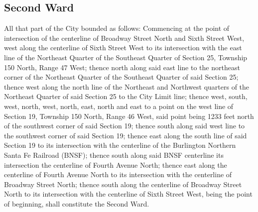 \subsection{Second Ward}
All that part of the City bounded as follows:  Commencing at the point of intersection of the centerline of Broadway Street North and Sixth Street West, west along the centerline of Sixth Street West to its intersection with the east line of the Northeast Quarter of the Southeast Quarter of Section 25, Township 150 North, Range 47 West; thence north along said east line to the northeast corner of the Northeast Quarter of the Southeast Quarter of said Section 25; thence west along the north line of the Northeast and Northwest quarters of the Northeast Quarter of said Section 25 to the City Limit line; thence west, south, west, north, west, north, east, north and east to a point on the west line of Section 19, Township 150 North, Range 46 West, said point being 1233 feet north of the southwest corner of said Section 19; thence south along said west line to the southwest corner of said Section 19; thence east along the south line of said Section 19 to its intersection with the centerline of the Burlington Northern Santa Fe Railroad (BNSF); thence south along said BNSF centerline its intersection the centerline of Fourth Avenue North; thence east along the centerline of Fourth Avenue North to its intersection with the centerline of Broadway Street North; thence south along the centerline of Broadway Street North to its intersection with the centerline of Sixth Street West, being the point of beginning, shall constitute the Second Ward.


